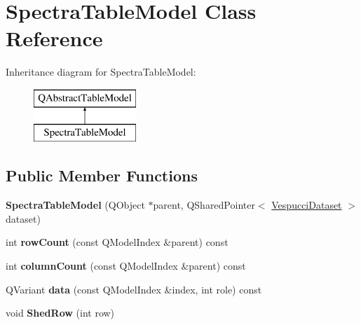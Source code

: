 \hypertarget{class_spectra_table_model}{}\section{Spectra\+Table\+Model Class Reference}
\label{class_spectra_table_model}
Inheritance diagram for Spectra\+Table\+Model\+:\begin{figure}[H]
\begin{center}
\leavevmode
\includegraphics[height=2.000000cm]{class_spectra_table_model}
\end{center}
\end{figure}
\subsection*{Public Member Functions}
\begin{DoxyCompactItemize}
\item 
{\bfseries Spectra\+Table\+Model} (Q\+Object $\ast$parent, Q\+Shared\+Pointer$<$ \hyperlink{class_vespucci_dataset}{Vespucci\+Dataset} $>$ dataset)\hypertarget{class_spectra_table_model_aa45b7aa24b474d23f87e1fd0cfb8c95d}{}\label{class_spectra_table_model_aa45b7aa24b474d23f87e1fd0cfb8c95d}

\item 
int {\bfseries row\+Count} (const Q\+Model\+Index \&parent) const \hypertarget{class_spectra_table_model_aa95ffaebe3561834f04f052ca2c0e0af}{}\label{class_spectra_table_model_aa95ffaebe3561834f04f052ca2c0e0af}

\item 
int {\bfseries column\+Count} (const Q\+Model\+Index \&parent) const \hypertarget{class_spectra_table_model_a89154e9842dc80dd6a7d8cb3e0f06081}{}\label{class_spectra_table_model_a89154e9842dc80dd6a7d8cb3e0f06081}

\item 
Q\+Variant {\bfseries data} (const Q\+Model\+Index \&index, int role) const \hypertarget{class_spectra_table_model_a342738c2ad4cf34982ad878996a7759b}{}\label{class_spectra_table_model_a342738c2ad4cf34982ad878996a7759b}

\item 
void {\bfseries Shed\+Row} (int row)\hypertarget{class_spectra_table_model_a93b39faeccf37b7234d4b0524938adb1}{}\label{class_spectra_table_model_a93b39faeccf37b7234d4b0524938adb1}

\end{DoxyCompactItemize}



